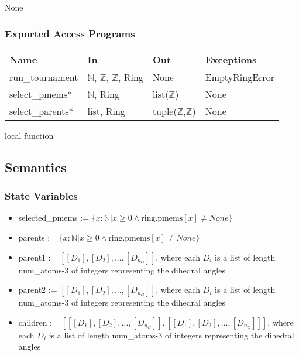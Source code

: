 \documentclass[12pt, titlepage]{article}
\begin{document}
None

\subsubsection{Exported Access Programs}

\begin{center}
	\begin{tabular}{p{3.5cm} p{4cm} p{4cm} p{2cm}}
		\hline
		\textbf{Name} & \textbf{In} & \textbf{Out} & \textbf{Exceptions} \\
		\hline
		run\_tournament & $\mathbb{N}$, $\mathbb{Z}$, $\mathbb{Z}$, Ring & None 
		& EmptyRingError \\
		select\_pmems* & $\mathbb{N}$, Ring & list($\mathbb{Z}$) & None \\
		select\_parents* & list, Ring & tuple($\mathbb{Z}$,$\mathbb{Z}$) & None 
		\\
		\hline
	\end{tabular}
\end{center}

\noindent * local function

\subsection{Semantics}

\subsubsection{State Variables}

\begin{itemize}
\item selected\_pmems := $\{x : \mathbb{N} | x \geq 0 \land 
\text{ring.pmems}[x] \neq None\}$
\item parents := $\{x : \mathbb{N} | x \geq 0 \land \text{ring.pmems}[x] \neq 
None\}$
\item parent1 := $[[D_1], [D_2], ..., [D_{n_G}]]$, where each 
$D_i$ is a list of length num\_atoms-3 of integers representing the dihedral 
angles
\item parent2 := $[[D_1], [D_2], ..., [D_{n_G}]]$, where each 
$D_i$ is a list of length num\_atoms-3 of integers representing the dihedral 
angles
\item children := $[[[D_1], [D_2], ..., [D_{n_G}]], [[D_1], [D_2], ..., 
[D_{n_G}]]]$, where each $D_i$ is a list of length num\_atoms-3 of integers 
representing the dihedral 
angles
\end{itemize}
\end{document}
